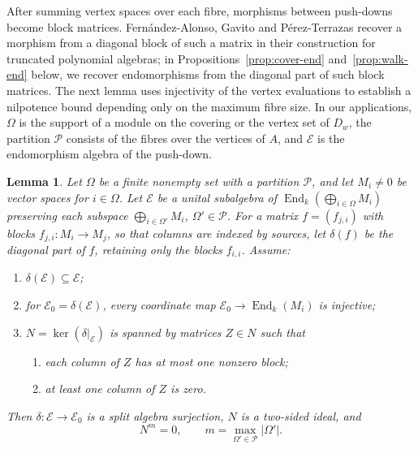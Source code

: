 \documentclass[a4paper,reqno,10pt]{amsart}
\newtheorem{lemma}[theorem]{Lemma}
\theoremstyle{definition}
\DeclareMathOperator{\End}{End}
\numberwithin{equation}{section}
\begin{document}
After summing vertex spaces over each fibre, morphisms between push-downs become block matrices.
Fern\'andez-Alonso, Gavito and P\'erez-Terrazas \cite{FernandezAlonso}
recover a morphism from a diagonal block of such a matrix in their
construction for truncated polynomial algebras; in
Propositions~\ref{prop:cover-end} and~\ref{prop:walk-end} below, we recover
endomorphisms from the diagonal part of such block matrices.
The next lemma uses injectivity of the vertex evaluations to establish a
nilpotence bound depending only on the maximum fibre size. In our
applications, $\Omega$ is the support of a module on the covering or the
vertex set of $D_w$, the partition $\mathcal P$ consists of the fibres over the vertices of $A$, and $\mathcal E$ is
the endomorphism algebra of the push-down.

\begin{lemma}
\label{lem:zero-column}
Let $\Omega$ be a finite nonempty set with a partition $\mathcal P$, and let
$M_i\ne0$ be vector spaces for $i\in\Omega$. Let $\mathcal E$ be a unital subalgebra
of $\End_k(\bigoplus_{i\in\Omega}M_i)$ preserving each subspace
$\bigoplus_{i\in\Omega'}M_i$, $\Omega'\in\mathcal P$. For a matrix
$f=(f_{j,i})$ with blocks $f_{j,i}:M_i\to M_j$, so that columns are indexed
by sources, let
$\delta(f)$ be the diagonal part of $f$, retaining only the blocks
$f_{i,i}$.
Assume:
\begin{enumerate}
\item $\delta(\mathcal E)\subseteq \mathcal E$;
\item for $\mathcal E_0=\delta(\mathcal E)$, every coordinate map
$\mathcal E_0\to\End_k(M_i)$ is injective;
\item $N=\ker(\delta|_{\mathcal E})$ is spanned by matrices $Z\in N$ such that
\begin{enumerate}[label={\upshape(\alph*)}]
\item each column of $Z$ has at most one nonzero block;
\item at least one column of $Z$ is zero.
\end{enumerate}
\end{enumerate}
Then $\delta:\mathcal E\to \mathcal E_0$ is a split algebra surjection, $N$ is a two-sided
ideal, and
\[
 N^m=0,\qquad m=\max_{\Omega'\in\mathcal P}|\Omega'|.
\]
\end{lemma}
\end{document}
